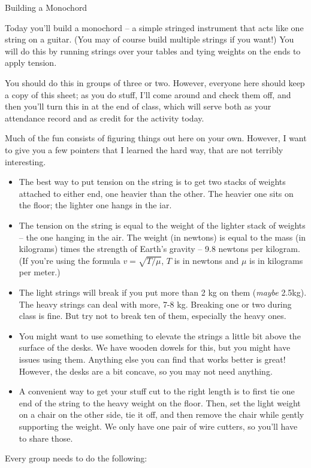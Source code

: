\documentclass[12pt]{article}
\begin{document}
\begin{center}
\Large{Building a Monochord}
\end{center}

Today you'll build a monochord -- a simple stringed instrument that acts like one string on a guitar. (You may of course build multiple strings if you want!) You
will do this by running strings over your tables and tying weights on the ends to apply tension.

You should do this in groups of three or two. However, everyone here should keep a copy of this sheet; as you do stuff, I'll come around and check them off, and 
then you'll turn this in at the end of class, which will serve both as your attendance record and as credit for the activity today.

Much of the fun consists of figuring things out here on your own. However, I want to give you a few pointers that I learned the hard way, that are not terribly
interesting.

\begin{itemize}

\item The best way to put tension on the string is to get two stacks of weights attached to either end, one heavier than the other. The heavier one sits on the floor;
the lighter one hangs in the iar.

\item The tension on the string is equal to the weight of the lighter stack of weights -- the one hanging in the air. The weight (in newtons) is equal to the mass
  (in kilograms) times the strength of Earth's gravity -- 9.8 newtons per kilogram. (If you're using the formula $v=\sqrt{T/\mu}$, $T$ is in newtons and $\mu$ is in 
    kilograms per meter.)

\item  The light strings will break if you put more than 2 kg on them ({\it maybe} 2.5kg). The heavy strings can deal with more, 7-8 kg. Breaking one or two during class
is fine. But try not to break ten of them, especially the heavy ones.

\item You might want to use something to elevate the strings a little bit above the surface of the desks. We have wooden dowels for this, but you might have issues using them.
Anything else you can find that works better is great! However, the desks are a bit concave, so you may not need anything. 

\item A convenient way to get your stuff cut to the right length is to first tie one end of the string to the heavy weight on the floor. Then, 
set the light weight on a chair on the other side, tie it off, and then remove the chair while gently supporting the weight. We only have one pair of wire cutters,
so you'll have to share those.

\end{itemize}
Every group needs to do the following:
\end{document}
